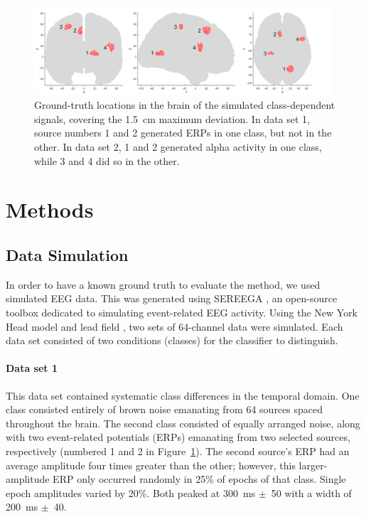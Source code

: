 \begin{figure}[!t]
    \centering
    \includegraphics[width=0.989\textwidth]{figures/visualisation-groundtruth.png}
    \caption{Ground-truth locations in the brain of the simulated class-dependent signals, covering the 1.5~cm maximum deviation. In data set 1, source numbers 1 and 2 generated ERPs in one class, but not in the other. In data set 2, 1 and 2 generated alpha activity in one class, while 3 and 4 did so in the other.}
    \label{fig:visualisation:groundtruth}
\end{figure}


\section{Methods}


\subsection{Data Simulation}

In order to have a known ground truth to evaluate the method, we used simulated EEG data. This was generated using SEREEGA \cite{krol2018sereega}, an open-source toolbox dedicated to simulating event-related EEG activity. Using the New York Head model and lead field \cite{huang2016nyhead}, two sets of 64-channel data were simulated. Each data set consisted of two conditions (classes) for the classifier to distinguish.

\paragraph{Data set 1} This data set contained systematic class differences in the temporal domain. One class consisted entirely of brown noise emanating from 64 sources spaced throughout the brain. The second class consisted of equally arranged noise, along with two event-related potentials (ERPs) emanating from two selected sources, respectively (numbered 1 and 2 in Figure~\ref{fig:visualisation:groundtruth}). The second source's ERP had an average amplitude four times greater than the other; however, this larger-amplitude ERP only occurred randomly in 25\% of epochs of that class. Single epoch amplitudes varied by 20\%. Both peaked at 300~ms $\pm$~50 with a width of 200~ms $\pm$~40.

